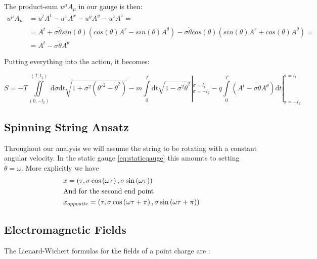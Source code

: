 \documentclass[11pt,a4paper]{article}
\begin{document}
The product-sum $ u^{\mu}A_{\mu} $ in our gauge is then:
\begin{align*}
u^{\mu}A_{\mu}&=u^{t}A^{t}-u^{x}A^{x}-u^{y}A^{y}-u^{z}A^{z}=\\
&=A^{t}+\sigma\dot{\theta}sin\left(\theta\right)\left(cos\left(\theta\right)A^{r}-sin\left(\theta\right)A^{\theta}\right)
-\sigma\dot{\theta}cos\left(\theta\right)\left(sin\left(\theta\right)A^{r}
+cos\left(\theta\right)A^{\theta}\right)=\\
&=A^{t}-\sigma\dot{\theta}A^{\theta}
\end{align*}

Putting everything into the action, it becomes:

\begin{equation}
\label{eq:actiongauged}
S=-T\iint\limits_{(0,-l_{2})}^{(T,l_{1})} \mathrm{d}\sigma  \mathrm{d}t\sqrt{1+\sigma^{2}\left(\theta'^{2}-\dot{\theta}^{2}\right)}-m\int\limits_0^T  \mathrm{d}t\sqrt{1-\sigma^{2}\dot{\theta}^{2}}|_{\sigma=-l_{2}}^{\sigma=l_{1}}-q\int\limits_{0}^{T}\left(A^{t}-\sigma\dot{\theta}A^{\theta}\right) \mathrm{d}	t|_{\sigma=-l_{2}}^{\sigma=l_{1}}
\end{equation}

\FloatBarrier
\subsection{Spinning String Ansatz}
Throughout our analysis we will assume the string to be rotating with a constant angular velocity. In the static gauge \ref{eq:staticqauge} this amounts to setting $\dot{\theta}=\omega$. More explicitly we have
\begin{subequations}
\label{eq:SpinningStringAnsatz}
\begin{align}
&x=\left(\tau,\sigma\cos\left(\omega\tau\right),\sigma\sin\left(\omega\tau\right)\right) \\
&\text{And for the second end point}\notag\\
&x_{opposite}=\left(\tau,\sigma\cos\left(\omega\tau+\pi\right),\sigma\sin\left(\omega\tau+\pi\right)\right)
\end{align}
\end{subequations}

\FloatBarrier
\subsection{Electromagnetic Fields}

The Lienard-Wichert formulas for the fields of a point charge are \cite{Jackson}:
\end{document}
